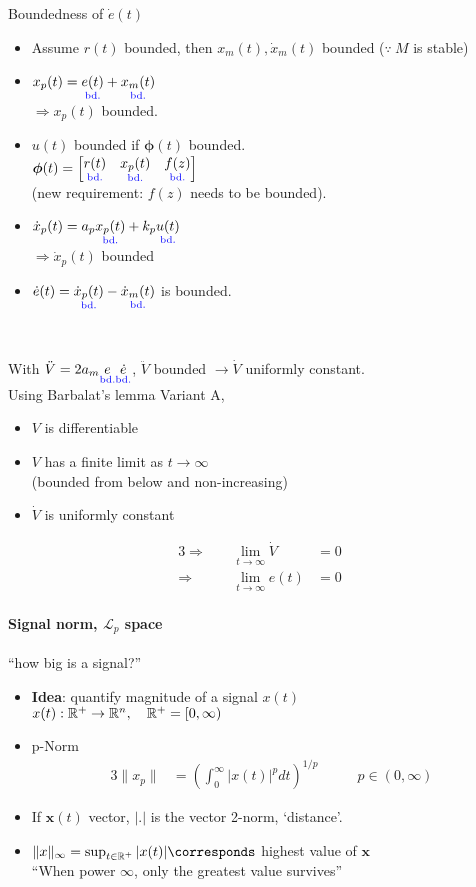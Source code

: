 Boundedness of $\dot{e}(t)$ 
\begin{itemize}
\item Assume $r(t)$ bounded, then
    $x_m(t), \dot{x}_m(t)$ bounded ($\because~ M$ is stable)
\item $x_p(t) = \underset{\textnormal{\color{blue}bd.}}{e(t)} + \underset{\textnormal{\color{blue}bd.}}{x_m(t)}$\\
    $\Rightarrow x_p(t)$ bounded.
\item $u(t)$ bounded if $\bm{\phi}(t)$ bounded.\\
    $\bm{\phi}(t) = \begin{bmatrix}\underset{\textnormal{\color{blue}bd.}}{r(t)} & \underset{\textnormal{\color{blue}bd.}}{x_p(t)} & \underset{\textnormal{\color{blue}bd.}}{f(z)}\end{bmatrix}$\\
    (new requirement: $f(z)$ needs to be bounded).
\item $\dot{x}_p(t) = a_p \underset{\textnormal{\color{blue}bd.}}{x_p(t)} + k_p \underset{\textnormal{\color{blue}bd.}}{u(t)}$\\
    $\Rightarrow \dot{x}_p(t)$ bounded\\
\item $\dot{e}(t) = \underset{\textnormal{\color{blue}bd.}}{\dot{x}_p(t)} - \underset{\textnormal{\color{blue}bd.}}{\dot{x}_m(t)}$
    is bounded.
\end{itemize}~

With $\ddot{V} = 2 a_m \underset{\textnormal{\color{blue}bd.}}{e} \underset{\textnormal{\color{blue}bd.}}{\dot{e}}$,
$\ddot{V}$ bounded $\rightarrow \dot{V}$ uniformly constant.\\

Using Barbalat's lemma Variant A,
\begin{itemize}
\item $V$ is differentiable
\item $V$ has a finite limit as $t \rightarrow \infty$ \\
    (bounded from below and non-increasing)
\item $\dot{V}$ is uniformly constant
\end{itemize}
\begin{alignat*}{3}
\Rightarrow& ~ & \lim_{t \rightarrow \infty} \dot{V} &= 0\\
\Rightarrow& ~ & \lim_{t \rightarrow \infty} e(t) &= 0
\end{alignat*}

\paragraph{Signal norm, $\mathcal{L}_p$ space}
``how big is a signal?''
\begin{itemize}
\item \textbf{Idea}: quantify magnitude of a signal $x(t)$\\
    $x(t): \mathbb{R}^+ \rightarrow \mathbb{R}^n, \quad \mathbb{R}^+ = [0, \infty)$
\item p-Norm
    \begin{alignat*}{3}
    \|x_p\| &= \left( \int_0^\infty |x(t)|^p dt \right)^{1/p}
        & \qquad p \in (0, \infty)
    \end{alignat*}
\item If $\bm{x}(t)$ vector, $|.|$ is the vector 2-norm,
    `distance'.
\item $\|x\|_\infty = \sup_{t \in \R^+} |x(t)| \corresponds$ 
    highest value of $\bm{x}$\\
    ``When power $\infty$, only the greatest value survives''
\end{itemize}


